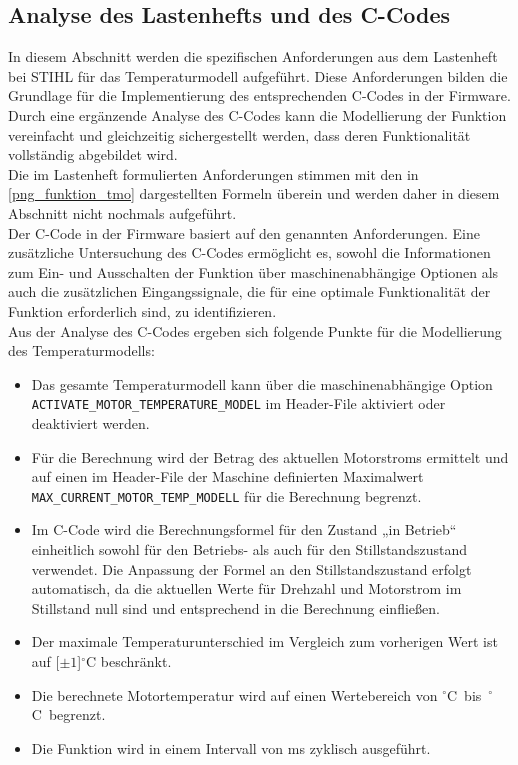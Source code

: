 \subsection{Analyse des Lastenhefts und des C-Codes}
\label{subsec_tmo_analyse}
In diesem Abschnitt werden die spezifischen Anforderungen aus dem Lastenheft bei STIHL für das Temperaturmodell aufgeführt. Diese Anforderungen bilden die Grundlage für die Implementierung des entsprechenden C-Codes in der Firmware. Durch eine ergänzende Analyse des C-Codes kann die Modellierung der Funktion vereinfacht und gleichzeitig sichergestellt werden, dass deren Funktionalität vollständig abgebildet wird. \\
Die im Lastenheft \cite{Lastenheft} formulierten Anforderungen stimmen mit den in \autoref{png_funktion_tmo} dargestellten Formeln überein und werden daher in diesem Abschnitt nicht nochmals aufgeführt.\\
Der C-Code in der Firmware basiert auf den genannten Anforderungen. Eine zusätzliche Untersuchung des C-Codes ermöglicht es, sowohl die Informationen zum Ein- und Ausschalten der Funktion über maschinenabhängige Optionen als auch die zusätzlichen Eingangssignale, die für eine optimale Funktionalität der Funktion erforderlich sind, zu identifizieren. \\
Aus der Analyse des C-Codes \cite{Firmware_gesamt} ergeben sich folgende Punkte für die Modellierung des Temperaturmodells:
\begin{itemize}
\item Das gesamte Temperaturmodell kann über die maschinenabhängige Option\\ \lstinline{ACTIVATE_MOTOR_TEMPERATURE_MODEL} im Header-File aktiviert oder deaktiviert werden.
\item Für die Berechnung wird der Betrag des aktuellen Motorstroms ermittelt und auf einen im Header-File der Maschine definierten Maximalwert \\ \lstinline{MAX_CURRENT_MOTOR_TEMP_MODELL} für die Berechnung begrenzt.
\item Im C-Code wird die Berechnungsformel für den Zustand „in Betrieb“ einheitlich sowohl für den Betriebs- als auch für den Stillstandszustand verwendet. Die Anpassung der Formel an den Stillstandszustand erfolgt automatisch, da die aktuellen Werte für Drehzahl und Motorstrom im Stillstand null sind und entsprechend in die Berechnung einfließen.
\item Der maximale Temperaturunterschied im Vergleich zum vorherigen Wert ist auf \unit[$\pm 1$]{$^\circ$C} beschränkt.
\item Die berechnete Motortemperatur wird auf einen Wertebereich von \unit[1]{$^\circ$C} bis \unit[195]{$^\circ$C} begrenzt.
\item Die Funktion wird in einem Intervall von \unit[10]{ms} zyklisch ausgeführt.
\end{itemize}

